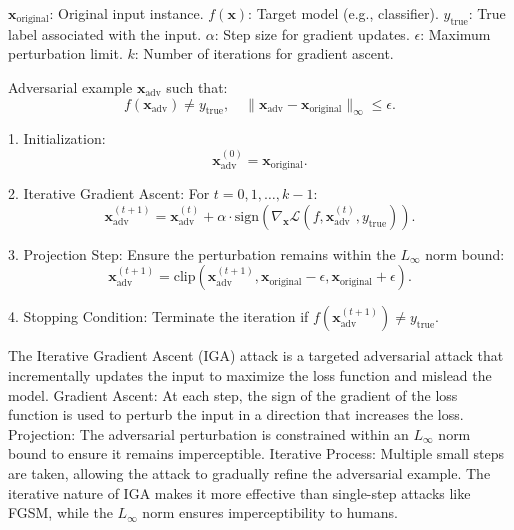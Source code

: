 $\mathbf{x}_{\text{original}}$: Original input instance.  
$f(\mathbf{x})$: Target model (e.g., classifier).  
$y_{\text{true}}$: True label associated with the input.  
$\alpha$: Step size for gradient updates.  
$\epsilon$: Maximum perturbation limit.  
$k$: Number of iterations for gradient ascent.  

Adversarial example $\mathbf{x}_{\text{adv}}$ such that:  
\[
f(\mathbf{x}_{\text{adv}}) \neq y_{\text{true}}, \quad \|\mathbf{x}_{\text{adv}} - \mathbf{x}_{\text{original}}\|_{\infty} \leq \epsilon.
\]

1. Initialization:  
   \[
   \mathbf{x}_{\text{adv}}^{(0)} = \mathbf{x}_{\text{original}}.
   \]

2. Iterative Gradient Ascent:  
   For $t = 0, 1, \dots, k-1$:  
   \[
   \mathbf{x}_{\text{adv}}^{(t+1)} = \mathbf{x}_{\text{adv}}^{(t)} + \alpha \cdot \text{sign}\left(\nabla_{\mathbf{x}} \mathcal{L}(f, \mathbf{x}_{\text{adv}}^{(t)}, y_{\text{true}})\right).
   \]

3. Projection Step: Ensure the perturbation remains within the $L_\infty$ norm bound:  
   \[
   \mathbf{x}_{\text{adv}}^{(t+1)} = \text{clip}\left(\mathbf{x}_{\text{adv}}^{(t+1)}, \mathbf{x}_{\text{original}} - \epsilon, \mathbf{x}_{\text{original}} + \epsilon\right).
   \]

4. Stopping Condition: Terminate the iteration if $f(\mathbf{x}_{\text{adv}}^{(t+1)}) \neq y_{\text{true}}$.  

The Iterative Gradient Ascent (IGA) attack is a targeted adversarial attack that incrementally updates the input to maximize the loss function and mislead the model. 
Gradient Ascent: At each step, the sign of the gradient of the loss function is used to perturb the input in a direction that increases the loss.  
Projection: The adversarial perturbation is constrained within an $L_\infty$ norm bound to ensure it remains imperceptible.  
Iterative Process: Multiple small steps are taken, allowing the attack to gradually refine the adversarial example.
The iterative nature of IGA makes it more effective than single-step attacks like FGSM, while the $L_\infty$ norm ensures imperceptibility to humans.
